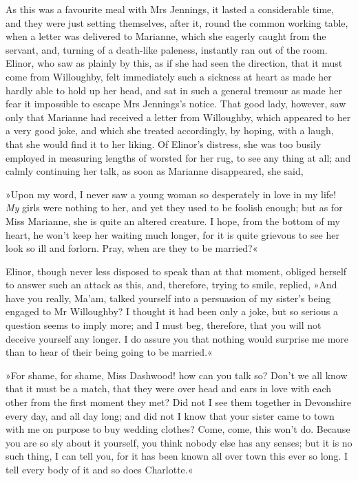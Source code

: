 As this was a favourite meal with Mrs Jennings, it lasted a considerable time, and they were just setting themselves, after it, round the common working table, when a letter was delivered to Marianne, which she eagerly caught from the servant, and, turning of a death-like paleness, instantly ran out of the room. Elinor, who saw as plainly by this, as if she had seen the direction, that it must come from Willoughby, felt immediately such a sickness at heart as made her hardly able to hold up her head, and sat in such a general tremour as made her fear it impossible to escape Mrs Jennings’s notice. That good lady, however, saw only that Marianne had received a letter from Willoughby, which appeared to her a very good joke, and which she treated accordingly, by hoping, with a laugh, that she would find it to her liking. Of Elinor’s distress, she was too busily employed in measuring lengths of worsted for her rug, to see any thing at all; and calmly continuing her talk, as soon as Marianne disappeared, she said,

»Upon my word, I never saw a young woman so desperately in love in my life! \textit{My} girls were nothing to her, and yet they used to be foolish enough; but as for Miss Marianne, she is quite an altered creature. I hope, from the bottom of my heart, he won’t keep her waiting much longer, for it is quite grievous to see her look so ill and forlorn. Pray, when are they to be married?«

Elinor, though never less disposed to speak than at that moment, obliged herself to answer such an attack as this, and, therefore, trying to smile, replied, »And have you really, Ma’am, talked yourself into a persuasion of my sister’s being engaged to Mr Willoughby? I thought it had been only a joke, but so serious a question seems to imply more; and I must beg, therefore, that you will not deceive yourself any longer. I do assure you that nothing would surprise me more than to hear of their being going to be married.«

»For shame, for shame, Miss Dashwood! how can you talk so? Don’t we all know that it must be a match, that they were over head and ears in love with each other from the first moment they met? Did not I see them together in Devonshire every day, and all day long; and did not I know that your sister came to town with me on purpose to buy wedding clothes? Come, come, this won’t do. Because you are so sly about it yourself, you think nobody else has any senses; but it is no such thing, I can tell you, for it has been known all over town this ever so long. I tell every body of it and so does Charlotte.«

